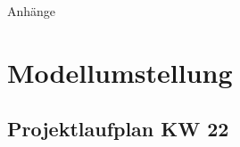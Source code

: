 %
%
%
%

\begin{appendix}

\newpage

\begin{center}
	\huge{Anhänge}
\end{center}

\normalsize

\newpage
\section{Modellumstellung}



\newpage
\begin{landscape}
	\section{Projektlaufplan KW 22}
	\label{sec:projectplan}
	\scalebox{.75}{
		
		}
\end{landscape}


\end{appendix}
